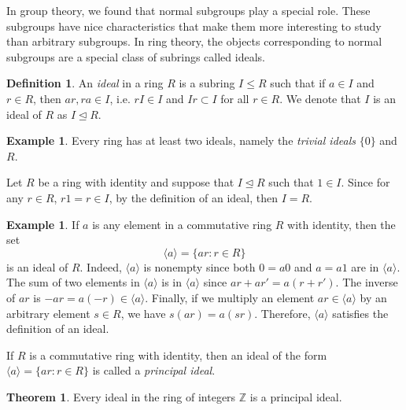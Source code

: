 \documentclass[11pt]{book}
\theoremstyle{definition}\newtheorem{definition}[subsection]{Definition}
\theoremstyle{definition}\newtheorem{example}[subsection]{Example}
\theoremstyle{definition}\newtheorem{notation}[subsection]{Notation}
\theoremstyle{definition}\newtheorem{remark}[subsection]{Remark}
\theoremstyle{theorem}\newtheorem{theorem}[subsection]{Theorem}
\theoremstyle{theorem}\newtheorem{lemma}[subsection]{Lemma}
\theoremstyle{theorem}\newtheorem{proposition}[subsection]{Proposition}
\theoremstyle{theorem}\newtheorem{corollary}[subsection]{Corollary}
\newcommand{\Z}{\mathbb{Z}}
\newcommand{\teq}{\trianglelefteq}
\begin{document}
In group theory, we found that normal subgroups play a special role. These subgroups have nice characteristics that make them more interesting to study than arbitrary subgroups. In ring theory, the objects corresponding to normal subgroups are a special class of subrings called ideals. 

\begin{definition}\label{definition:1.3.6}
    An \emph{ideal} in a ring $R$ is a subring $I \leq R$ such that if $a \in I$ and $r \in R$, then $ar, ra \in I$, i.e. $rI \in I$ and $Ir \subset I$ for all $r \in R$. We denote that $I$ is an ideal of $R$ as $I \trianglelefteq R$.
\end{definition}

\begin{example}\label{example:1.3.7}
    Every ring has at least two ideals, namely the \emph{trivial ideals} $\{0\}$ and $R$.
\end{example}

Let $R$ be a ring with identity and suppose that $I \teq R$ such that $1 \in I$. Since for any $r \in R$, $r1 = r \in I$, by the definition of an ideal, then $I = R$.

\begin{example}\label{example:1.3.8}
    If $a$ is any element in a commutative ring $R$ with identity, then the set
    \begin{equation*}
        \langle{a}\rangle = \{ar : r \in R\}
    \end{equation*}
    is an ideal of $R$. Indeed, $\langle{a}\rangle$ is nonempty since both $0 = a0$ and $a = a1$ are in $\langle{a}\rangle$. The sum of two elements in $\langle{a}\rangle$ is in $\langle{a}\rangle$ since $ar + ar' = a(r + r')$. The inverse of $ar$ is $-ar = a(-r) \in \langle{a}\rangle$. Finally, if we multiply an element $ar \in \langle{a}\rangle$ by an arbitrary element $s \in R$, we have $s(ar) = a(sr)$. Therefore, $\langle{a}\rangle$ satisfies the definition of an ideal.

    If $R$ is a commutative ring with identity, then an ideal of the form $\langle{a}\rangle = \{ar : r \in R\}$ is called a \emph{principal ideal}.
\end{example} 

\begin{theorem}\label{theorem:1.3.9}
    Every ideal in the ring of integers $\Z$ is a principal ideal.
\end{theorem}
\end{document}
